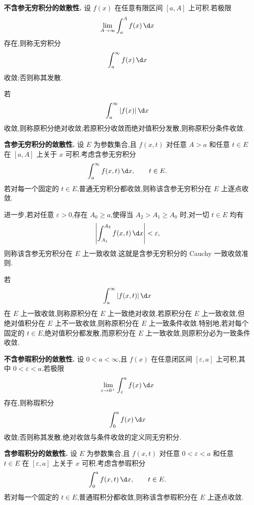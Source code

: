 \textbf{不含参无穷积分的敛散性.}
设 $f(x)$ 在任意有限区间 $[a,A]$ 上可积.若极限
\begin{equation*}
	\lim_{A\to\infty}\int_a^A f(x)\,\d x
\end{equation*}
存在,则称无穷积分
\begin{equation*}
	\int_a^\infty f(x)\,\d x
\end{equation*}
收敛;否则称其发散.

若
\begin{equation*}
	\int_a^\infty |f(x)|\,\d x
\end{equation*}
收敛,则称原积分绝对收敛;若原积分收敛而绝对值积分发散,则称原积分条件收敛.

\textbf{含参无穷积分的敛散性.}
设 $E$ 为参数集合,且 $f(x,t)$ 对任意 $A>a$ 和任意 $t\in E$ 在 $[a,A]$ 上关于 $x$ 可积.考虑含参无穷积分
\begin{equation*}
	\int_a^\infty f(x,t)\,\d x,
	\qquad t\in E.
\end{equation*}
若对每一个固定的 $t\in E$,普通无穷积分都收敛,则称该含参无穷积分在 $E$ 上逐点收敛.

进一步,若对任意 $\varepsilon>0$,存在 $A_0\geq a$,使得当 $A_2>A_1\geq A_0$ 时,对一切 $t\in E$ 均有
\begin{equation*}
	\left|\int_{A_1}^{A_2} f(x,t)\,\d x\right|<\varepsilon,
\end{equation*}
则称该含参无穷积分在 $E$ 上一致收敛.这就是含参无穷积分的 Cauchy 一致收敛准则.

若
\begin{equation*}
	\int_a^\infty |f(x,t)|\,\d x
\end{equation*}
在 $E$ 上一致收敛,则称原积分在 $E$ 上一致绝对收敛.若原积分在 $E$ 上一致收敛,但绝对值积分在 $E$ 上不一致收敛,则称原积分在 $E$ 上一致条件收敛.特别地,若对每个固定的 $t\in E$,绝对值积分都发散,而原积分在 $E$ 上一致收敛,则原积分必为一致条件收敛.

\textbf{不含参瑕积分的敛散性.}
设 $0<a<\infty$,且 $f(x)$ 在任意闭区间 $[\varepsilon,a]$ 上可积,其中 $0<\varepsilon<a$.若极限
\begin{equation*}
	\lim_{\varepsilon\to0^+}\int_\varepsilon^a f(x)\,\d x
\end{equation*}
存在,则称瑕积分
\begin{equation*}
	\int_0^a f(x)\,\d x
\end{equation*}
收敛;否则称其发散.绝对收敛与条件收敛的定义同无穷积分.

\textbf{含参瑕积分的敛散性.}
设 $E$ 为参数集合,且 $f(x,t)$ 对任意 $0<\varepsilon<a$ 和任意 $t\in E$ 在 $[\varepsilon,a]$ 上关于 $x$ 可积.考虑含参瑕积分
\begin{equation*}
	\int_0^a f(x,t)\,\d x,
	\qquad t\in E.
\end{equation*}
若对每一个固定的 $t\in E$,普通瑕积分都收敛,则称该含参瑕积分在 $E$ 上逐点收敛.

